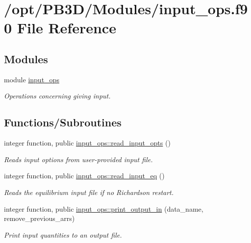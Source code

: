 \hypertarget{input__ops_8f90}{}\section{/opt/\+P\+B3\+D/\+Modules/input\+\_\+ops.f90 File Reference}
\label{input__ops_8f90}
\subsection*{Modules}
\begin{DoxyCompactItemize}
\item 
module \hyperlink{namespaceinput__ops}{input\+\_\+ops}
\begin{DoxyCompactList}\small\item\em Operations concerning giving input. \end{DoxyCompactList}\end{DoxyCompactItemize}
\subsection*{Functions/\+Subroutines}
\begin{DoxyCompactItemize}
\item 
integer function, public \hyperlink{namespaceinput__ops_a434acca4f59f9dc1d91e04f846133684}{input\+\_\+ops\+::read\+\_\+input\+\_\+opts} ()
\begin{DoxyCompactList}\small\item\em Reads input options from user-\/provided input file. \end{DoxyCompactList}\item 
integer function, public \hyperlink{namespaceinput__ops_a577c897cc266961eb40bb5ef747fa077}{input\+\_\+ops\+::read\+\_\+input\+\_\+eq} ()
\begin{DoxyCompactList}\small\item\em Reads the equilibrium input file if no Richardson restart. \end{DoxyCompactList}\item 
integer function, public \hyperlink{namespaceinput__ops_a6a1237ee3005ebd6f4978e7092ab2dc5}{input\+\_\+ops\+::print\+\_\+output\+\_\+in} (data\+\_\+name, remove\+\_\+previous\+\_\+arrs)
\begin{DoxyCompactList}\small\item\em Print input quantities to an output file. \end{DoxyCompactList}\end{DoxyCompactItemize}
